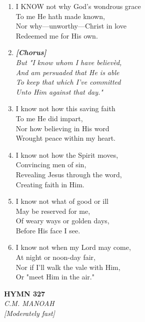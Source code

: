 \documentclass[11pt,a4paper]{article}
\begin{document}
\begin{enumerate}
    \item I KNOW not why God's wondrous grace \\
        To me He hath made known, \\
        Nor why---unworthy---Christ in love \\
        Redeemed me for His own.

    \item[] \vspace{0.4em}
    \textbf{\textit{[Chorus]}} \\
    \textit{But "I know whom I have believ\`ed,} \\
    \textit{And am persuaded that He is able} \\
    \textit{To keep that which I've committed} \\
    \textit{Unto Him against that day."}
    \vspace{0.4em}

    \item I know not how this saving faith \\
        To me He did impart, \\
        Nor how believing in His word \\
        Wrought peace within my heart.

    \item I know not how the Spirit moves, \\
        Convincing men of sin, \\
        Revealing Jesus through the word, \\
        Creating faith in Him.

    \item I know not what of good or ill \\
        May be reserved for me, \\
        Of weary ways or golden days, \\
        Before His face I see.

    \item I know not when my Lord may come, \\
        At night or noon-day fair, \\
        Nor if I'll walk the vale with Him, \\
        Or "meet Him in the air."

\end{enumerate}

\newpage
\begin{center}
    {\Large \textbf{HYMN 327}}
    \\
    \textit{C.M. MANOAH}
    \\
    \textit{\small [Moderately fast]}
\end{center}
\vspace{1em}
\end{document}
